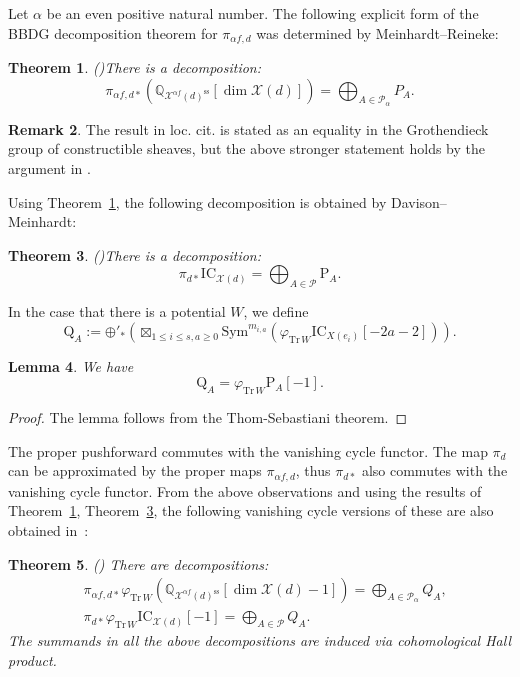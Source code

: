\documentclass [11pt,oneside,a4paper,mathscr]{amsart}
\newtheorem{thm}{Theorem}[section]
\newtheorem{lemma}[thm]{Lemma}
\theoremstyle{definition}
\newtheorem{remark}[thm]{Remark}
\renewcommand{\leq}{\leqslant}
\renewcommand{\geq}{\geqslant}
\newcommand{\X}{\mathscr{X}}
\begin{document}
Let $\alpha$ be an even positive natural number.
The following explicit form of the BBDG decomposition theorem for $\pi_{\alpha f,d}$ was determined by Meinhardt--Reineke:
\begin{thm}\emph{(\cite[Proposition 4.3]{MeRe})}\label{thm:MeiRei}
There is a decomposition:
\begin{equation}\label{MR}
    \pi_{\alpha f,d*}\left(\mathbb{Q}_{\X^{\alpha f}(d)^{\text{ss}}}[\dim \X(d)]\right)=\bigoplus_{A\in \mathscr{P}_\alpha}P_A.
\end{equation}
\end{thm}
\begin{remark}
The result in loc. cit. is stated as an equality in the Grothendieck group of constructible sheaves, but the above stronger statement holds by the argument in \cite[Proof of Theorem 4.10]{DM}.
\end{remark}
Using Theorem~\ref{thm:MeiRei}, 
the following decomposition is obtained by Davison--Meinhardt:
\begin{thm}\emph{(\cite[Theorem~C]{DM})}\label{Dav-Mein:deco}
There is a decomposition: 
\begin{equation}\label{DM}
\pi_{d*}\mathrm{IC}_{\X(d)}=\bigoplus_{A\in\mathscr{P}}\mathrm{P}_A.
\end{equation}
\end{thm}

In the case that there is a potential $W$, we define  
\begin{equation}\label{defqa}
\mathrm{Q}_A:=\oplus'_*\left(\boxtimes_{1\leq i\leq s, a\geq 0} \mathrm{Sym}^{m_{i,a}} \left(\varphi_{\mathrm{Tr}\,W}\mathrm{IC}_{X(e_i)}[-2a-2]\right)\right).
\end{equation}
\begin{lemma}\label{lem:Q=P}
We have 
\[\mathrm{Q}_A=\varphi_{\mathrm{Tr}\,W}\mathrm{P}_A[-1].\]
\end{lemma}
\begin{proof}
The lemma follows from the Thom-Sebastiani theorem. 
\end{proof}
The proper pushforward commutes with the vanishing cycle functor. The map $\pi_d$ can be approximated by the proper maps $\pi_{\alpha f, d}$, thus $\pi_{d*}$ also commutes with the vanishing cycle functor.
From the above observations and 
using 
the results of Theorem~\ref{thm:MeiRei}, Theorem~\ref{Dav-Mein:deco}, 
the following vanishing cycle versions of these 
are also obtained in~\cite{DM}:
\begin{thm}\emph{(\cite{DM})}
There are decompositions: 
\begin{align}\label{MRW}
    &\pi_{\alpha f,d*}\varphi_{\mathrm{Tr}\,W}\left(\mathbb{Q}_{\X^{\alpha f}(d)^{\text{ss}}}[\dim \X(d)-1]\right)=\bigoplus_{A\in \mathscr{P}_\alpha}Q_A, \\
    \label{DMW}
    &\pi_{d*}\varphi_{\mathrm{Tr}\,W}\mathrm{IC}_{\X(d)}[-1]=\bigoplus_{A\in\mathscr{P}}Q_{A}.
\end{align}
The summands in all the above decompositions are induced via cohomological Hall product. 
\end{thm}
\end{document}
